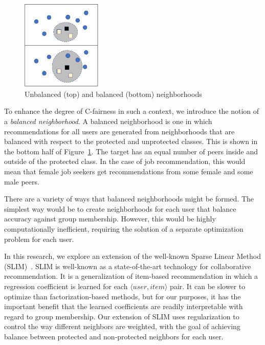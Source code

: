 \begin{figure}[bh]
    \centering
    \includegraphics[width=1.5in]{imgs/bln/neighborhood.pdf}
    \caption{Unbalanced (top) and balanced (bottom) neighborhoods}
    \label{fig:neighbor}
\end{figure}

To enhance the degree of C-fairness in such a context, we introduce the notion of a \textit{balanced neighborhood}. A balanced neighborhood is one in which recommendations for all users are generated from neighborhoods that are balanced with respect to the protected and unprotected classes. This is shown in the bottom half of Figure~\ref{fig:neighbor}. The target has an equal number of peers inside and outside of the protected class. In the case of job recommendation, this would mean that female job seekers get recommendations from some female and some male peers.

There are a variety of ways that balanced neighborhoods might be formed. The simplest way would be to create neighborhoods for each user that balance accuracy against group membership. However, this would be highly computationally inefficient, requiring the solution of a separate optimization problem for each user. 

In this research, we explore an extension of the well-known Sparse Linear Method (SLIM)~\cite{ning2011slim}. SLIM is well-known as a state-of-the-art technology for collaborative recommendation. It is a generalization of item-based recommendation in which a regression coefficient is learned for each $\langle user, item \rangle$ pair. It can be slower to optimize than factorization-based methods, but for our purposes, it has the important benefit that the learned coefficients are readily interpretable with regard to group membership. Our extension of SLIM uses regularization to control the way different neighbors are weighted, with the goal of achieving balance between protected and non-protected neighbors for each user.



